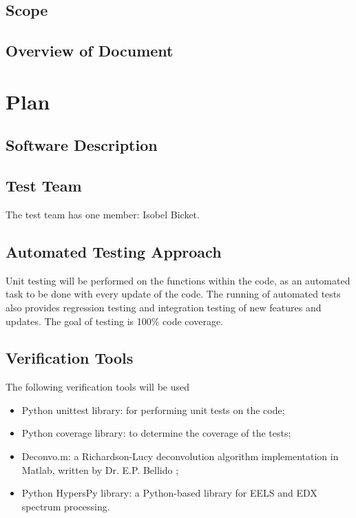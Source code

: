\documentclass[12pt, titlepage]{article}
\begin{document}
\subsection{Scope}

\subsection{Overview of Document}

\section{Plan}
	
\subsection{Software Description}

\subsection{Test Team}

The test team has one member: Isobel Bicket.

\subsection{Automated Testing Approach}

Unit testing will be performed on the functions within the code, as an automated task to be done with every update of the code. The running of automated tests also provides regression testing and integration testing of new features and updates. The goal of testing is 100\% code coverage.

\subsection{Verification Tools}

The following verification tools will be used
\begin{itemize}
	\item Python unittest library: for performing unit tests on the code;
	\item Python coverage library: to determine the coverage of the tests;
	\item Deconvo.m: a Richardson-Lucy deconvolution algorithm implementation in Matlab, written by Dr. E.P. Bellido \cite{bellido_toward_2014};
	\item Python HypersPy library: a Python-based library for EELS and EDX spectrum processing.
\end{itemize}
\end{document}
